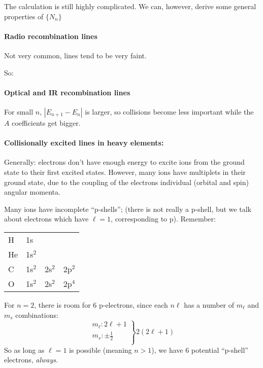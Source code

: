 \documentclass[12pt]{article}
\newcommand{\mar}[1]{\hspace{0pt}\marginpar{-\textcolor{black}{#1}-}}
\begin{document}
\mar{71}The calculation is still highly complicated. We can, however,
derive some general properties of $\{N_{n}\}$

\paragraph{Radio recombination lines}
Not very common, lines tend to be very faint.

\mar{72}So:
\[
    \]

\paragraph{Optical and IR recombination lines}
For small $n$, $|E_{n+1} - E_{n}|$ is larger, so collisions become
less important while the $A$ coefficients get bigger.


\paragraph{Collisionally excited lines in heavy elements:}
\mar{79}Generally: electrons don't have enough energy to excite ions from
the ground state to their first excited states. However, many
ions have multiplets in their ground state, due to the coupling of
the electrons individual (orbital and spin) angular momenta.

Many ions have incomplete ``p-shells''; (there is not really a p-shell,
but we talk about electrons which have $\ell = 1$, corresponding to p).
Remember:

\begin{tabular}{l l l l}
    H & 1s\\
    He & 1s$^{2}$\\
    C & 1s$^{2}$ & 2s$^{2}$ & 2p$^{2}$\\
    O & 1s$^{2}$ & 2s$^{2}$ & 2p$^{4}$
\end{tabular}
For $n=2$, there is room for 6 p-electrons, since each $n\ell$ has
a number of $m_{\ell}$ and $m_{s}$ combinations:
\begin{equation*}
    \left.
        \begin{array}{l}
            m_{\ell}: 2\ell+1\\
            m_{s}: \pm \frac{1}{2}\\
        \end{array}
    \right\} 2(2\ell+1)
\end{equation*}
So as long as $\ell=1$ is possible (meaning $n>1$), we have 6 potential
``p-shell'' electrons, \emph{always}.
\end{document}

